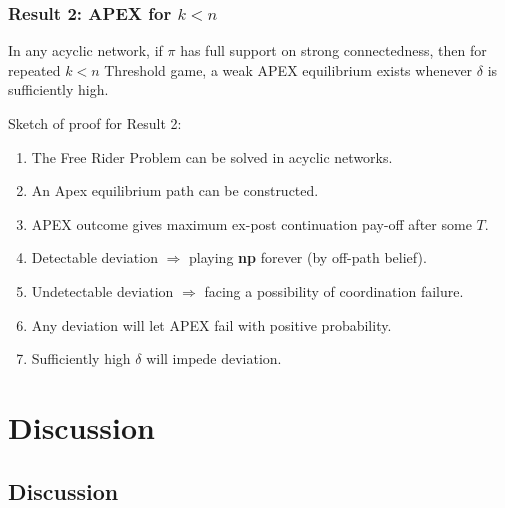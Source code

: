 \documentclass[9pt]{beamer}
\begin{document}
\begin{frame}
\frametitle{Result 2: APEX for $k<n$}
\begin{theorem}[$k< n$]
\label{thm_main_result}
In any \alert{acyclic} network, if $\pi$ has \alert{full support on strong connectedness}, then for repeated $k<n$ Threshold game, a {weak} APEX equilibrium {exists} whenever $\delta$ is sufficiently high.
\end{theorem}
Sketch of proof for Result 2:
\begin{enumerate}
\item The Free Rider Problem can be solved in acyclic networks.
\item An Apex equilibrium path can be constructed.
\item APEX outcome gives maximum ex-post continuation pay-off after some $T$.
\item Detectable deviation $\Rightarrow$ playing \textbf{np} forever (by off-path belief).
\item Undetectable deviation $\Rightarrow$ facing a possibility of coordination failure.
\item Any deviation will let APEX fail with positive probability.
\item Sufficiently high $\delta$ will impede deviation.
\end{enumerate}



\end{frame}


\section{Discussion}
\subsection{Discussion}
\end{document}
